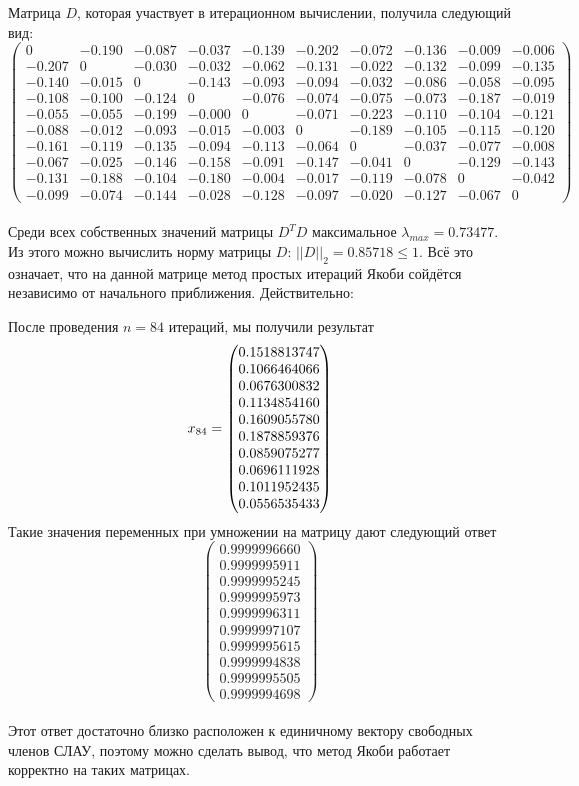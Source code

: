 \documentclass[../../report.tex]{subfiles}
\begin{document}
Матрица $D$, которая участвует в итерационном вычислении, получила следующий вид: \\
\[
\begin{pmatrix}
0 & -0.190 & -0.087 & -0.037 & -0.139 & -0.202 & -0.072 & -0.136 & -0.009 & -0.006 \\
-0.207 & 0 & -0.030 & -0.032 & -0.062 & -0.131 & -0.022 & -0.132 & -0.099 & -0.135 \\
-0.140 & -0.015 & 0 & -0.143 & -0.093 & -0.094 & -0.032 & -0.086 & -0.058 & -0.095 \\
-0.108 & -0.100 & -0.124 & 0 & -0.076 & -0.074 & -0.075 & -0.073 & -0.187 & -0.019 \\ 
-0.055 & -0.055 & -0.199 & -0.000 & 0 & -0.071 & -0.223 & -0.110 & -0.104 & -0.121 \\
-0.088 & -0.012 & -0.093 & -0.015 & -0.003 & 0 & -0.189 & -0.105 & -0.115 & -0.120 \\
-0.161 & -0.119 & -0.135 & -0.094 & -0.113 & -0.064 & 0 & -0.037 & -0.077 & -0.008 \\
-0.067 & -0.025 & -0.146 & -0.158 & -0.091 & -0.147 & -0.041 & 0 & -0.129 & -0.143 \\
-0.131 & -0.188 & -0.104 & -0.180 & -0.004 & -0.017 & -0.119 & -0.078 & 0 & -0.042 \\
-0.099 & -0.074 & -0.144 & -0.028 & -0.128 & -0.097 & -0.020 & -0.127 & -0.067 & 0 
\end{pmatrix}
\] \\

Среди всех собственных значений матрицы $D^T D$ максимальное $\lambda_{max} = 0.73477$. 
Из этого можно вычислить норму матрицы $D$: $||D||_2 = 0.85718 \leq 1$. 
Всё это означает, что на данной матрице метод простых итераций Якоби сойдётся
независимо от начального приближения. Действительно:

После проведения $n = 84$ итераций, мы получили результат 
\[
x_{84} = \begin{pmatrix} 0.1518813747 \\ 0.1066464066 \\ 0.0676300832 \\ 0.1134854160 \\ 0.1609055780 \\ 0.1878859376 \\ 0.0859075277 \\ 0.0696111928 \\ 0.1011952435 \\ 0.0556535433 \end{pmatrix}
\]
Такие значения переменных при умножении на матрицу дают следующий ответ
\[
\begin{pmatrix}
0.9999996660 \\
0.9999995911 \\
0.9999995245 \\
0.9999995973 \\
0.9999996311 \\
0.9999997107 \\
0.9999995615 \\
0.9999994838 \\
0.9999995505 \\
0.9999994698
\end{pmatrix}
\] \\
Этот ответ достаточно близко расположен к единичному вектору свободных членов СЛАУ,
поэтому можно сделать вывод, что метод Якоби работает корректно на таких матрицах.
\end{document}
